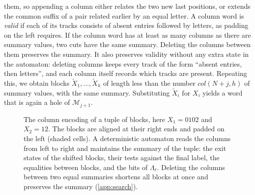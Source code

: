 them, so appending a column either relates the two new last positions, or extends the
common suffix of a pair related earlier by an equal letter. A column word is
\emph{valid} if each of its tracks consists of absent entries followed by letters, as
padding on the left requires. If the column word has at least as many columns as there
are summary values, two cuts have the same summary. Deleting the columns between them
preserves the summary. It also preserves validity without any extra state in the
automaton: deleting columns keeps every track of the form ``absent entries, then
letters'', and each column itself records which tracks are present. Repeating this, we
obtain blocks $\widetilde X_1,\dots,\widetilde X_h$ of length less than the number
$\mathit{col}(N+j,h)$ of summary values, with the same summary. Substituting
$\widetilde X_i$ for $X_i$ yields a word that is again a hole of $\mathcal{M}_{j+1}$.

\begin{figure}[tbp]
\centering
{}
\caption{The column encoding of a tuple of blocks, here $X_1 = 0102$ and $X_2 = 12$. The
blocks are aligned at their right ends and padded on the left (shaded cells). A deterministic
automaton reads the columns from left to right and maintains the summary of the tuple: the
exit states of the shifted blocks, their tests against the final label, the equalities between blocks, and the
bits of $\Lambda_\ell$. Deleting the columns between two equal summaries shortens all blocks
at once and preserves the summary (\cref{app:search}).}
\label{fig:columns}
\end{figure}

